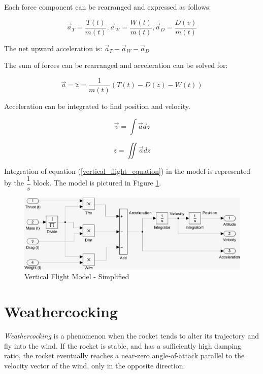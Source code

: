 \documentclass[]{book}
\begin{document}
Each force component can be rearranged and expressed as follows:

\begin{equation}
\vec{a}_T = \dfrac{T(t)}{m(t)}, \vec{a}_W = \dfrac{W(t)}{m(t)}, \vec{a}_D = \dfrac{D(v)}{m(t)}
\end{equation}

The net upward acceleration is: \(\vec{a}_T - \vec{a}_W - \vec{a}_D\)

The sum of forces can be rearranged and acceleration can be solved for:

\begin{equation}
\label{vertical_flight_equation}
\vec{a} =  \ddot{z} = \dfrac{1}{m(t)} (T(t) - D(\dot{z}) - W(t)) 
\end{equation}

Acceleration can be integrated to find position and velocity.

\begin{equation}
\vec{v} = \int \vec{a} dz
\end{equation}

\begin{equation}
z = \iint \vec{a} dz
\end{equation}

Integration of equation (\ref{vertical_flight_equation}) in the model is
represented by the \(\dfrac{1}{s}\) block. The model is pictured in
Figure \ref{vertical_model_simplified}.

\begin{figure}[htbp]
\centering
\includegraphics{images/vertical_model_simplified.png}
\caption{Vertical Flight Model - Simplified
\label{vertical_model_simplified}}
\end{figure}

\section{Weathercocking}\label{weathercocking}

\emph{Weathercocking} is a phenomenon when the rocket tends to alter its
trajectory and fly into the wind. If the rocket is stable, and has a
sufficiently high damping ratio, the rocket eventually reaches a
near-zero angle-of-attack parallel to the velocity vector of the wind,
only in the opposite direction.
\end{document}
